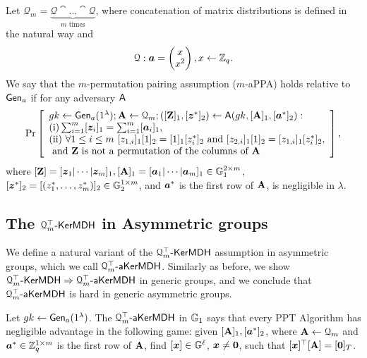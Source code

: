 \begin{definition}
Let $\mathcal{Q}_{m}=\underbrace{\mathcal{Q}\cat\ldots\cat\mathcal{Q}}_{m\text{ times}}$, where concatenation of matrix distributions is defined in the natural way and 
$$\mathcal{Q}: {\boldsymbol{a}}=\left(\begin{matrix}x\\x^2\end{matrix}\right), x\gets\mathbb{Z}_q.$$
We say that the $m$-permutation pairing assumption ($m$-aPPA) holds relative to $\mathsf{Gen}_a$ if for any adversary $\mathsf{A}$
$$
\Pr\left[
\begin{array}{l}
	gk\gets\G_a(1^\lambda);\matr{A}\gets\mathcal{Q}_{m};([\matr{Z}]_1,[\vecb{z}^*]_2)\gets\advA(gk,[\matr{A}]_1,[\vecb{a}^*]_2):\\
	\mathrm{(i)} \sum_{i=1}^{m}[\vecb{z}_i]_1 = \sum_{i=1}^{m}[\vecb{a}_i]_1,\\
	\mathrm{(ii)}\ \forall 1\leq i\leq m\ [z_{1,i}]_1[1]_2=[1]_1[z^*_{i}]_2 \text{ and } [z_{2,i}]_1[1]_2=[z_{1,i}]_1[z^*_{i}]_2,\\
	\text{ and }\matr{Z}\text{ is not a permutation of the columns of }\matr{A}
\end{array}
\right],
$$
where $[\mathbf{{Z}}]=[{\boldsymbol{z}}_1|\cdots|{\boldsymbol{z}}_m]_1, [\mathbf{{A}}]_1=[{\boldsymbol{a}}_1|\cdots|{\boldsymbol{a}}_m]_1\in\mathbb{G}_1^{2\times m}$, $[{\boldsymbol{z}}^*]_2=\allowbreak[(z^*_1,\ldots,\allowbreak z^*_m)]_2\in\mathbb{G}_2^{1\times m}$, and ${\boldsymbol{a}}^*$ is the first row of $\mathbf{{A}}$, is negligible in $\lambda$.
\end{definition}

\subsection{The $\mathcal{Q}_m^\top\mbox{-}\mathsf{KerMDH}$ in Asymmetric groups}
We define a natural variant of the $\mathcal{Q}_m^\top\mbox{-}\mathsf{KerMDH}$ assumption in asymmetric groups, which we call $\mathcal{Q}_m^\top\mbox{-}\mathsf{aKerMDH}$. Similarly as before, we show $\mathcal{Q}_m^\top\mbox{-}\mathsf{KerMDH}\Rightarrow \mathcal{Q}_m^\top\mbox{-}\mathsf{aKerMDH}$ in generic groups, and we conclude that $\mathcal{Q}_m^\top\mbox{-}\mathsf{aKerMDH}$ is hard in generic asymmetric groups. 

\begin{definition}
Let  ${gk} \gets\mathsf{Gen}_a(1^\lambda)$.
The $\mathcal{Q}_m^\top\mbox{-}\mathsf{aKerMDH}$ in $\mathbb{G}_1$ says that every PPT Algorithm has negligible advantage in the following  game: given $[\mathbf{{A}}]_1,[{\boldsymbol{a}}^*]_2$, where $\mathbf{{A}} \gets \mathcal{Q}_m$ and ${\boldsymbol{a}}^*\in\mathbb{Z}_q^{1\times m}$ is the first row of $\mathbf{{A}}$, find $[{\boldsymbol{x}}] \in \mathbb{G}^{\ell}$, ${\boldsymbol{x}} \neq {\boldsymbol{0}}$, such that 
$[{\boldsymbol{x}}]^{\top}[\mathbf{{A}}]=[{\boldsymbol{0}}]_T$. 
\end{definition}

